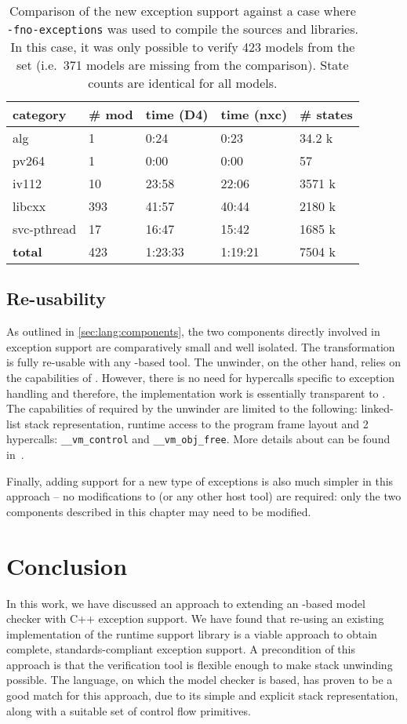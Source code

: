 \begin{table}[tp]
\caption{\label{tbl:D4nxc}Comparison of the new exception support
against a case where \texttt{-fno-exceptions} was used to compile the
sources and libraries. In this case, it was only possible to verify 423
models from the set (i.e.~371 models are missing from the comparison).
State counts are identical for all models. }
\begin{tabularx}{\textwidth}{llLLL}
\toprule
category & \# mod & time (D4) & time (nxc) & \# states\tabularnewline
\midrule
alg & 1 & 0:24 & 0:23 & 34.2 k\tabularnewline
pv264 & 1 & 0:00 & 0:00 & 57\tabularnewline
iv112 & 10 & 23:58 & 22:06 & 3571 k\tabularnewline
libcxx & 393 & 41:57 & 40:44 & 2180 k\tabularnewline
svc-pthread & 17 & 16:47 & 15:42 & 1685 k\tabularnewline
\textbf{total} & 423 & 1:23:33 & 1:19:21 & 7504 k\tabularnewline
\bottomrule
\end{tabularx}
\end{table}

\subsection{Re-usability}\label{sec:lang:re-usability}

As outlined in \autoref{sec:lang:components}, the two components directly
involved in exception support are comparatively small and well isolated.
The \llvm{} transformation is fully re-usable with any \llvm{}-based tool. The
unwinder, on the other hand, relies on the capabilities of \divm{}.
However, there is no need for hypercalls specific to exception handling
and therefore, the implementation work is essentially transparent to
\divm{}. The capabilities of \divm{} required by the unwinder are limited to
the following: linked-list stack representation, runtime access to the
program frame layout and 2 hypercalls:
\texttt{\_\_vm\_control} and \texttt{\_\_vm\_obj\_free}. More details about
\divm{} can be found in~.

Finally, adding support for a new type of exceptions is also much
simpler in this approach -- no modifications to \divm{} (or any other host
tool) are required: only the two components described in this chapter may
need to be modified.

\section{Conclusion}\label{sec:lang:conclusion}

In this work, we have discussed an approach to extending an \llvm{}-based
model checker with C++ exception support. We have found that re-using an
existing implementation of the runtime support library is a viable
approach to obtain complete, standards-compliant exception support. A
precondition of this approach is that the verification tool is flexible
enough to make stack unwinding possible. The \divm{} language, on which the
\divine{} model checker is based, has proven to be a good match for this
approach, due to its simple and explicit stack representation, along
with a suitable set of control flow primitives.

